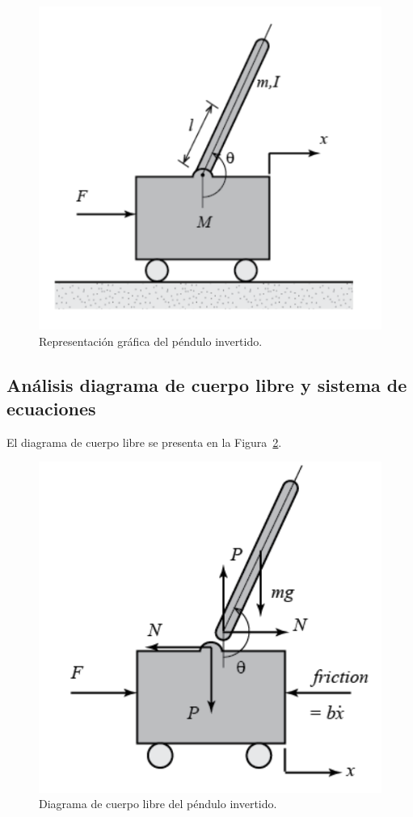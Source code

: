 \documentclass[journal]{IEEEtran}
\begin{document}
\begin{figure}[h!]
\caption{Representación gráfica del péndulo invertido.\label{diagram}}
  \centering
\includegraphics[scale=0.48]{pendulo.PNG}
\end{figure}

\subsection{Análisis diagrama de cuerpo libre y sistema de ecuaciones}

El diagrama de cuerpo libre se presenta en la Figura~\ref{cuerpo}.\\

\begin{figure}[]
\caption{Diagrama de cuerpo libre del péndulo invertido.\label{cuerpo}}
  \centering
\includegraphics[scale=0.48]{diagrama_cuerpo.PNG}
\end{figure}
\end{document}
